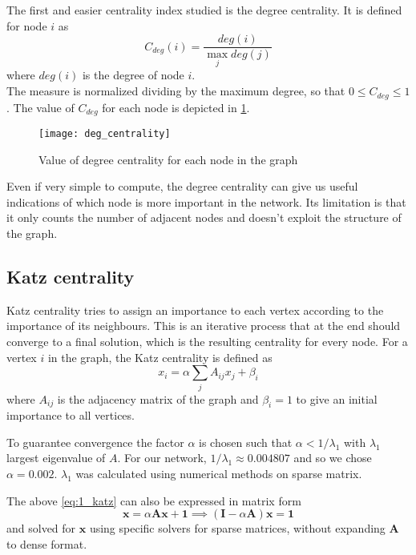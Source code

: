 The first and easier centrality index studied is the degree centrality. It is defined for node $i$ as
\begin{equation}
C_{deg}(i)=\frac{deg(i)}{\max_{j}  deg(j) }
\end{equation}
where $deg(i)$ is the degree of node $i$.\\
The measure is normalized dividing by the maximum degree, so that $0\leq C_{deg} \leq 1$.
The value of $C_{deg}$ for each node is depicted in \cref{fig:1_deg_centrality}.

\begin{figure} [!ht]
	\centering
	\texttt{[image: deg\_centrality]}
	\caption{Value of degree centrality for each node in the graph}
	\label{fig:1_deg_centrality}
\end{figure}

Even if very simple to compute, the degree centrality can give us useful indications of which node is more important in the network. Its limitation is that it only counts the number of adjacent nodes and doesn't exploit the structure of the graph.


\subsection{Katz centrality}
Katz centrality tries to assign an importance to each vertex according to the importance of its neighbours. This is an iterative process that at the end should converge to a final solution, which is the resulting centrality for every node. 
For a vertex $i$ in the graph, the Katz centrality is defined as
\begin{equation}\label{eq:1_katz}
x_i=\alpha \sum_{j}{A_{ij}x_{j}} + \beta_i
\end{equation}
where $A_{ij}$ is the adjacency matrix of the graph and $\beta_i=1$ to give an initial importance to all vertices.

To guarantee convergence the factor $\alpha$ is chosen such that $\alpha<1/\lambda_1$ with $\lambda_1$ largest eigenvalue of $A$.
For our network, $1/\lambda_1 \approx 0.004807$ and so we chose $\alpha=0.002$. $\lambda_1$ was calculated using numerical methods on sparse matrix.

The above \cref{eq:1_katz} can also be expressed in matrix form
\begin{equation}\label{eq:1_katz_mat}
\mathbf{x}=\alpha \mathbf{A} \mathbf{x} + \mathbf{1} \implies (\mathbf{I} - \alpha  \mathbf{A}) \mathbf{x}= \mathbf{1}
\end{equation}
and solved for $\mathbf{x}$ using specific solvers for sparse matrices, without expanding $\mathbf{A}$ to dense format.

